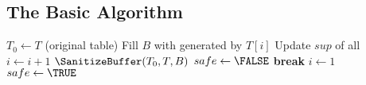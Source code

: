 \subsection{The Basic Algorithm}
\label{sec:basic}
%
\begin{algorithm}[th]
\caption{$\PartialSuppressor(T,\bmax)$}
\label{algo:partialsuppressor}
\begin{algorithmic}[1]
\STATE $T_0 \gets T$ (original table)
    \LOOP
         \label{algo:enu_s}
             \STATE Fill $B$ with \qids generated by $T[i]$ \label{algo:enumerate1}
             \STATE Update $sup$ of all \qids \label{algo:enumerate2}
             \STATE $i\leftarrow i+1$
        \ENDWHILE \label{algo:enu_e}
        \label{line:containunsafe}
            \STATE $\SanitizeBuffer(T_0, T, B)$\label{line:sanitizebuffer}
            \STATE $safe\leftarrow\FALSE$
        \ENDIF
            \STATE \textbf{break}\label{algo:partialbreak}
                \STATE $i\leftarrow 1$
                \STATE $safe\leftarrow\TRUE$
        \ENDIF
    \ENDLOOP
\end{algorithmic}
\end{algorithm}

